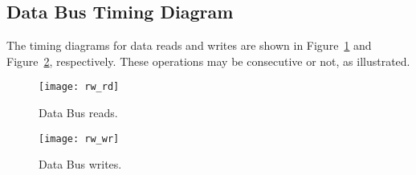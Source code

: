 \subsection{Data Bus Timing Diagram}
\label{sec:rwi}

The timing diagrams for data reads and writes are shown in
Figure~\ref{fig:rwird} and Figure~\ref{fig:rwiwr}, respectively. These
operations may be consecutive or not, as illustrated.

\begin{figure}[htbp]
    \centerline{\texttt{[image: rw\_rd]}}
    \vspace{0cm}\caption{Data Bus reads.}
    \label{fig:rwird}
\end{figure}

\begin{figure}[htbp]
    \centerline{\texttt{[image: rw\_wr]}}
    \vspace{0cm}\caption{Data Bus writes.}
    \label{fig:rwiwr}
\end{figure}

